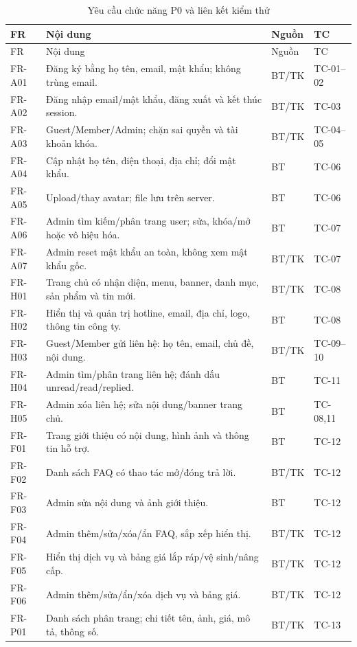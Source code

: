 {\small
\begin{longtable}{@{}P{1.8cm}P{9.6cm}P{1.3cm}P{1.8cm}@{}}
\caption{Yêu cầu chức năng P0 và liên kết kiểm thử}\label{tab:fr}\\
\toprule FR & Nội dung & Nguồn & TC\\\midrule\endfirsthead
\toprule FR & Nội dung & Nguồn & TC\\\midrule\endhead
FR-A01 & Đăng ký bằng họ tên, email, mật khẩu; không trùng email. & BT/TK & TC-01–02\\
FR-A02 & Đăng nhập email/mật khẩu, đăng xuất và kết thúc session. & BT/TK & TC-03\\
FR-A03 & Guest/Member/Admin; chặn sai quyền và tài khoản khóa. & BT/TK & TC-04–05\\
FR-A04 & Cập nhật họ tên, điện thoại, địa chỉ; đổi mật khẩu. & BT & TC-06\\
FR-A05 & Upload/thay avatar; file lưu trên server. & BT & TC-06\\
FR-A06 & Admin tìm kiếm/phân trang user; sửa, khóa/mở hoặc vô hiệu hóa. & BT & TC-07\\
FR-A07 & Admin reset mật khẩu an toàn, không xem mật khẩu gốc. & BT/TK & TC-07\\
FR-H01 & Trang chủ có nhận diện, menu, banner, danh mục, sản phẩm và tin mới. & BT/TK & TC-08\\
FR-H02 & Hiển thị và quản trị hotline, email, địa chỉ, logo, thông tin công ty. & BT & TC-08\\
FR-H03 & Guest/Member gửi liên hệ: họ tên, email, chủ đề, nội dung. & BT/TK & TC-09–10\\
FR-H04 & Admin tìm/phân trang liên hệ; đánh dấu unread/read/replied. & BT & TC-11\\
FR-H05 & Admin xóa liên hệ; sửa nội dung/banner trang chủ. & BT & TC-08,11\\
FR-F01 & Trang giới thiệu có nội dung, hình ảnh và thông tin hỗ trợ. & BT & TC-12\\
FR-F02 & Danh sách FAQ có thao tác mở/đóng trả lời. & BT/TK & TC-12\\
FR-F03 & Admin sửa nội dung và ảnh giới thiệu. & BT & TC-12\\
FR-F04 & Admin thêm/sửa/xóa/ẩn FAQ, sắp xếp hiển thị. & BT/TK & TC-12\\
FR-F05 & Hiển thị dịch vụ và bảng giá lắp ráp/vệ sinh/nâng cấp. & BT/TK & TC-12\\
FR-F06 & Admin thêm/sửa/ẩn/xóa dịch vụ và bảng giá. & BT/TK & TC-12\\
FR-P01 & Danh sách phân trang; chi tiết tên, ảnh, giá, mô tả, thông số. & BT/TK & TC-13\\

\end{longtable}}

